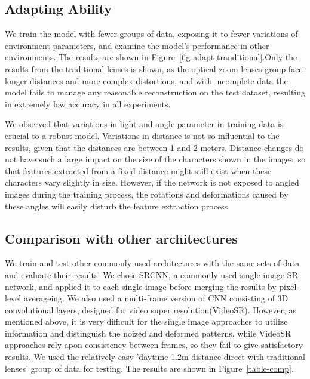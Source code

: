 \subsection{Adapting Ability}
We train the model with fewer groups of data, exposing it to fewer variations of environment parameters, and examine the model’s performance in other environments. The results are shown in Figure~\ref{fig-adapt-tranditional}.Only the results from the traditional lenses is shown, as the optical zoom lenses group face longer distances and more complex distortions, and with incomplete data the model fails to manage any reasonable reconstruction on the test dataset, resulting in extremely low accuracy in all experiments.


We observed that variations in light and angle parameter in training data is crucial to a robust model. Variations in distance is not so influential to the results, given that the distances are between 1 and 2 meters. Distance changes do not have such a large impact on the size of the characters shown in the images, so that features extracted from a fixed distance might still exist when these characters vary slightly in size. However, if the network is not exposed to angled images during the training process, the rotations and deformations caused by these angles will easily disturb the feature extraction process.

\subsection{Comparison with other architectures}
We train and test other commonly used architectures with the same sets of data and evaluate their results. We chose SRCNN, a commonly used single image SR network, and applied it to each single image before merging the results by pixel-level averageing. We also used a multi-frame version of CNN consisting of 3D convolutional layers, designed for video super resolution(VideoSR). However, as mentioned above, it is very difficult for the single image approaches to utilize information and distinguish the noized and deformed patterns, while VideoSR approaches rely apon consistency between frames, so they fail to give satisfactory results. We used the relatively easy 'daytime 1.2m-distance direct with traditional lenses' group of data for testing. The results are shown in Figure~\ref{table-comp}.

